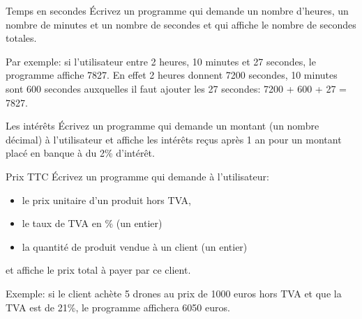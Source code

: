 \documentclass[a4paper,11pt]{article}
\begin{document}
	\begin{Exercice}{Temps en secondes} 
		\'Ecrivez un programme qui demande 
		un nombre d'heures, un nombre de minutes et un nombre de secondes
		et qui affiche le nombre de secondes totales.
		
		Par exemple: si l'utilisateur entre 2 heures, 10 minutes et 27 secondes, le 
		programme affiche
		7827. En effet 2 heures donnent 7200 secondes, 10 minutes sont 600 secondes 
		auxquelles il faut ajouter les 27 secondes: 7200 + 600 + 27 = 7827. 
	\end{Exercice}


	\begin{Exercice}{Les intérêts}
		\'Ecrivez un programme qui demande un montant (un nombre décimal)
		à l'utilisateur et affiche les intérêts reçus après 1 an pour un montant placé 
		en banque à du 2\% d'intérêt.
	\end{Exercice}

	\begin{Exercice}{Prix TTC}
		\'Ecrivez un programme qui demande à l'utilisateur:
		\begin{itemize}
			\item le prix unitaire d’un produit hors TVA, 
			\item le taux de TVA en \% (un entier) 
			\item la quantité de produit vendue à un client (un entier)
		\end{itemize}
		et affiche le prix total à payer par ce client.
		
		Exemple: si le client achète 5 drones au prix de 1000 euros hors TVA et que la
		TVA est de 21\%, le programme affichera 6050 euros.
	\end{Exercice}
\end{document}
